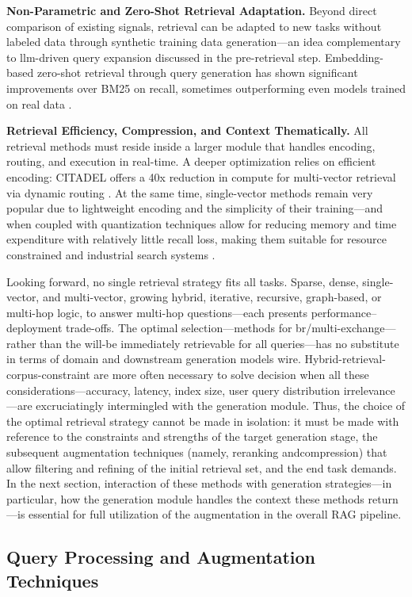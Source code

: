 \documentclass[11pt]{article}
\begin{document}
\textbf{Non-Parametric and Zero-Shot Retrieval Adaptation.} Beyond direct comparison of existing signals, retrieval can be adapted to new tasks without labeled data through synthetic training data generation---an idea complementary to llm-driven query expansion discussed in the pre-retrieval step. Embedding-based zero-shot retrieval through query generation has shown significant improvements over BM25 on recall, sometimes outperforming even models trained on real data \cite{ref21}.

\textbf{Retrieval Efficiency, Compression, and Context Thematically.} All retrieval methods must reside inside a larger module that handles encoding, routing, and execution in real-time. A deeper optimization relies on efficient encoding: CITADEL offers a 40x reduction in compute for multi-vector retrieval via dynamic routing \cite{ref17}. At the same time, single-vector methods remain very popular due to lightweight encoding and the simplicity of their training---and when coupled with quantization techniques allow for reducing memory and time expenditure with relatively little recall loss, making them suitable for resource constrained and industrial search systems \cite{ref20}.

Looking forward, no single retrieval strategy fits all tasks. Sparse, dense, single-vector, and multi-vector, growing hybrid, iterative, recursive, graph-based, or multi-hop logic, to answer multi-hop questions---each presents performance--deployment trade-offs. The optimal selection---methods for br/multi-exchange---rather than the will-be immediately retrievable for all queries---has no substitute in terms of domain and downstream generation models wire. Hybrid-retrieval-corpus-constraint are more often necessary to solve decision when all these considerations---accuracy, latency, index size, user query distribution irrelevance---are excruciatingly intermingled with the generation module. Thus, the choice of the optimal retrieval strategy cannot be made in isolation: it must be made with reference to the constraints and strengths of the target generation stage, the subsequent augmentation techniques (namely, reranking andcompression) that allow filtering and refining of the initial retrieval set, and the end task demands. In the next section, interaction of these methods with generation strategies---in particular, how the generation module handles the context these methods return---is essential for full utilization of the augmentation in the overall RAG pipeline.

\subsection{Query Processing and Augmentation Techniques}
\end{document}

